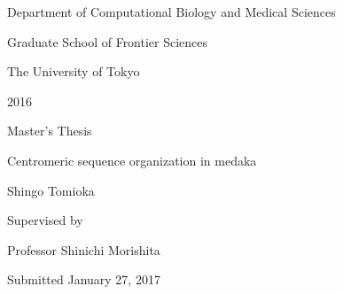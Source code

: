 \thispagestyle{empty}
\begin{center}
\vspace{0.5cm}

{\Large
Department of Computational Biology and Medical Sciences

\vspace{0.2cm}

Graduate School of Frontier Sciences

\vspace{0.3cm}

The University of Tokyo
}

\vspace{1cm}

{\huge 2016}

\vspace{1cm}

{\Large Master's Thesis}

\vspace{3cm}

{\huge Centromeric sequence organization in medaka}

\vspace{2.5cm}

{\huge Shingo Tomioka}

\vspace{3cm}

{\Large Supervised by}

\vspace{0.3cm}

{\Large Professor Shinichi Morishita}

\vspace{4cm}

{\Large Submitted January 27, 2017}


\end{center}
